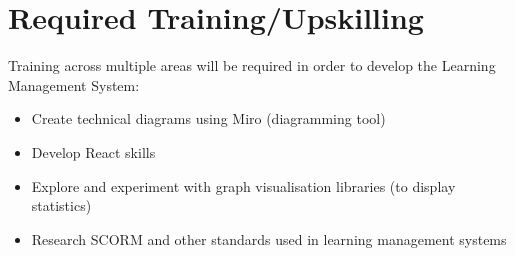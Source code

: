 \section{Required Training/Upskilling}
Training across multiple areas will be required in order to develop the Learning Management System:

\begin{itemize}
	\item Create technical diagrams using Miro (diagramming tool)
	\item Develop React skills
	\item Explore and experiment with graph visualisation libraries (to display statistics)
	\item Research SCORM and other standards used in learning management systems
\end{itemize}